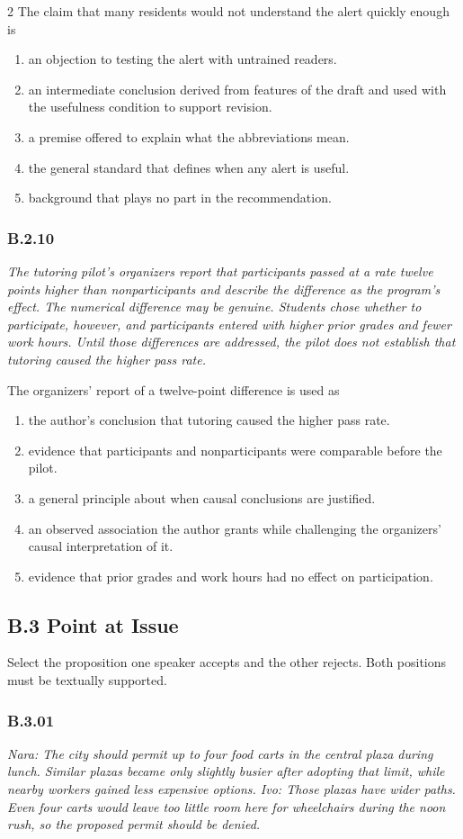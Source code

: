 \documentclass[10pt]{extarticle}
\newcommand{\choice}[1]{\item #1}
\newcommand{\bankitem}[1]{\subsubsection*{#1}}
\begin{document}
\begin{multicols}{2}
The claim that many residents would not understand the alert quickly enough is
\begin{enumerate}[label=(\alph*)]
  \choice{an objection to testing the alert with untrained readers.}
  \choice{an intermediate conclusion derived from features of the draft and used with the usefulness condition to support revision.}
  \choice{a premise offered to explain what the abbreviations mean.}
  \choice{the general standard that defines when any alert is useful.}
  \choice{background that plays no part in the recommendation.}
\end{enumerate}
\bankitem{B.2.10}
\emph{The tutoring pilot's organizers report that participants passed at a rate twelve points higher than nonparticipants and describe the difference as the program's effect. The numerical difference may be genuine. Students chose whether to participate, however, and participants entered with higher prior grades and fewer work hours. Until those differences are addressed, the pilot does not establish that tutoring caused the higher pass rate.}

The organizers' report of a twelve-point difference is used as
\begin{enumerate}[label=(\alph*)]
  \choice{the author's conclusion that tutoring caused the higher pass rate.}
  \choice{evidence that participants and nonparticipants were comparable before the pilot.}
  \choice{a general principle about when causal conclusions are justified.}
  \choice{an observed association the author grants while challenging the organizers' causal interpretation of it.}
  \choice{evidence that prior grades and work hours had no effect on participation.}
\end{enumerate}
\subsection*{B.3 Point at Issue}
Select the proposition one speaker accepts and the other rejects. Both positions must be textually supported.
\bankitem{B.3.01}
\emph{Nara: The city should permit up to four food carts in the central plaza during lunch. Similar plazas became only slightly busier after adopting that limit, while nearby workers gained less expensive options. Ivo: Those plazas have wider paths. Even four carts would leave too little room here for wheelchairs during the noon rush, so the proposed permit should be denied.}


\end{multicols}
\end{document}
